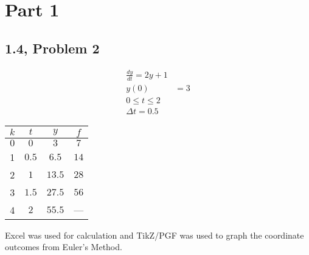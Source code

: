 \documentclass[10pt]{mypackage}
\begin{document}
\RaggedRight
\section{Part 1}%
\subsection{1.4, Problem 2}%
\begin{align*}
  \frac{dy}{dt} = 2y + 1\\
  y(0) &= 3\\
  0 \leq t \leq 2\\
  \Delta t = 0.5
\end{align*}
\begin{center}
  \begin{tabular}{c|c|c|c}
    $k$ & $t$ & $y$ & $f$\\
    \hline
    $0$ & $0$ & $3$ & $7$\\
    1 & $0.5$ & $6.5$ & $14$\\
    2 & $1$ & $13.5$ & $28$\\
    3 & $1.5$ & $27.5$ & $56$\\
    4 & $2$ & $55.5$ & ---
  \end{tabular}
\end{center}
\begin{center}
\end{center}
Excel was used for calculation and TikZ/PGF was used to graph the coordinate outcomes from Euler's Method.
\end{document}
